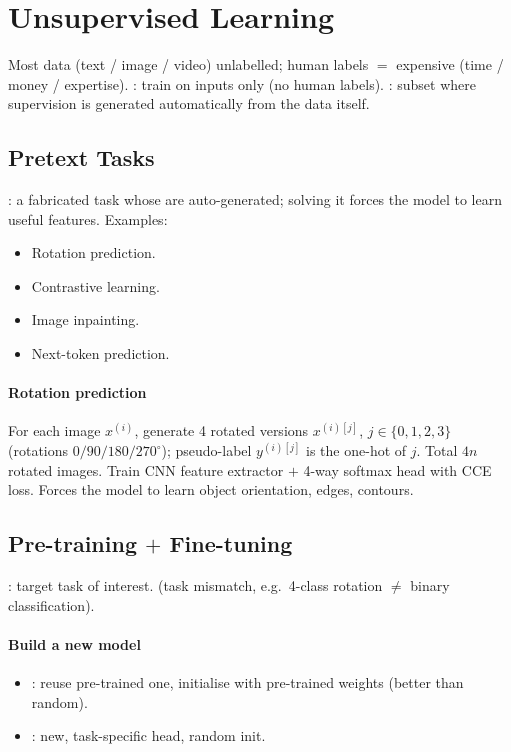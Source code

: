 \section{Unsupervised Learning}
Most data (text / image / video) unlabelled; human labels $=$ expensive (time / money / expertise). : train on inputs only (no human labels). : subset where supervision is generated automatically from the data itself.

\subsection{Pretext Tasks}
: a fabricated task whose  are auto-generated; solving it forces the model to learn useful features. Examples:
\begin{itemize}
\item Rotation prediction.
\item Contrastive learning.
\item Image inpainting.
\item Next-token prediction.
\end{itemize}
\paragraph{Rotation prediction} For each image $x^{(i)}$, generate 4 rotated versions $x^{(i)[j]}$, $j\!\in\!\{0,1,2,3\}$ (rotations $0/90/180/270^{\circ}$); pseudo-label $y^{(i)[j]}$ is the one-hot of $j$. Total $4n$ rotated images. Train CNN feature extractor $+$ 4-way softmax head with CCE loss. Forces the model to learn object orientation, edges, contours.

\subsection{Pre-training $+$ Fine-tuning}
: target task of interest.  (task mismatch, e.g.\ 4-class rotation $\neq$ binary classification).
\paragraph{Build a new model}
\begin{itemize}
\item {}: reuse pre-trained one, initialise with pre-trained weights (better than random).
\item {}: new, task-specific head, random init.
\end{itemize}
